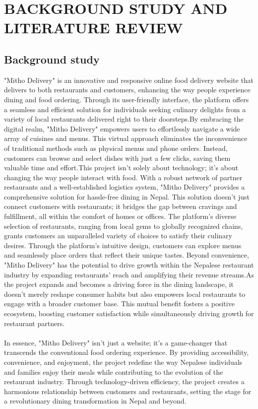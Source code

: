 \chapter{BACKGROUND STUDY AND LITERATURE REVIEW}

\section{Background study}
"Mitho Delivery" is an innovative and responsive online food delivery website that delivers to both restaurants and customers, enhancing the way people experience dining and food ordering. Through its user-friendly interface, the platform offers a seamless and efficient solution for individuals seeking culinary delights from a variety of local restaurants delivered right to their doorsteps.By embracing the digital realm, "Mitho Delivery" empowers users to effortlessly navigate a wide array of cuisines and menus. This virtual approach eliminates the inconvenience of traditional methods such as physical menus and phone orders. Instead, customers can browse and select dishes with just a few clicks, saving them valuable time and effort.This project isn't solely about technology; it's about changing the way people interact with food. With a robust network of partner restaurants and a well-established logistics system, "Mitho Delivery" provides a comprehensive solution for hassle-free dining in Nepal. This solution doesn't just connect customers with restaurants; it bridges the gap between cravings and fulfillment, all within the comfort of homes or offices.
The platform's diverse selection of restaurants, ranging from local gems to globally recognized chains, grants customers an unparalleled variety of choices to satisfy their culinary desires. Through the platform's intuitive design, customers can explore menus and seamlessly place orders that reflect their unique tastes. Beyond convenience, "Mitho Delivery" has the potential to drive growth within the Nepalese restaurant industry by expanding restaurants' reach and amplifying their revenue streams.As the project expands and becomes a driving force in the dining landscape, it doesn't merely reshape consumer habits but also empowers local restaurants to engage with a broader customer base. This mutual benefit fosters a positive ecosystem, boosting customer satisfaction while simultaneously driving growth for restaurant partners.
\\\\
In essence, "Mitho Delivery" isn't just a website; it's a game-changer that transcends the conventional food ordering experience. By providing accessibility, convenience, and enjoyment, the project redefine the way Nepalese individuals and families enjoy their meals while contributing to the evolution of the restaurant industry. Through technology-driven efficiency, the project creates a harmonious relationship between customers and restaurants, setting the stage for a revolutionary dining transformation in Nepal and beyond.

